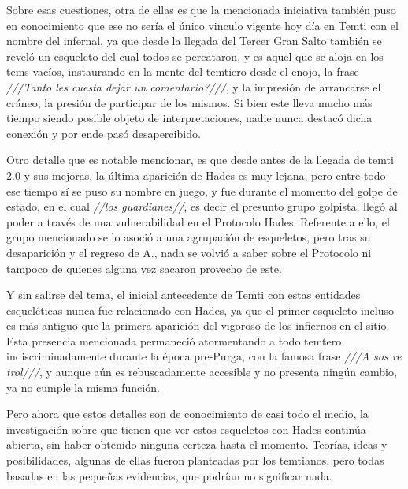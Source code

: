 \documentclass[
  spanish,
]{book}
\begin{document}
Sobre esas cuestiones, otra de ellas es que la mencionada iniciativa también puso en conocimiento que ese no sería el único vinculo vigente hoy día en Temti con el nombre del infernal, ya que desde la llegada del Tercer Gran Salto también se reveló un esqueleto del cual todos se percataron, y es aquel que se aloja en los tems vacíos, instaurando en la mente del temtiero desde el enojo, la frase \emph{///Tanto les cuesta dejar un comentario?///}, y la impresión de arrancarse el cráneo, la presión de participar de los mismos. Si bien este lleva mucho más tiempo siendo posible objeto de interpretaciones, nadie nunca destacó dicha conexión y por ende pasó desapercibido.

Otro detalle que es notable mencionar, es que desde antes de la llegada de temti 2.0 y sus mejoras, la última aparición de Hades es muy lejana, pero entre todo ese tiempo sí se puso su nombre en juego, y fue durante el momento del golpe de estado, en el cual \emph{//los guardianes//}, es decir el presunto grupo golpista, llegó al poder a través de una vulnerabilidad en el Protocolo Hades. Referente a ello, el grupo mencionado se lo asoció a una agrupación de esqueletos, pero tras su desaparición y el regreso de A., nada se volvió a saber sobre el Protocolo ni tampoco de quienes alguna vez sacaron provecho de este.

Y sin salirse del tema, el inicial antecedente de Temti con estas entidades esqueléticas nunca fue relacionado con Hades, ya que el primer esqueleto incluso es más antiguo que la primera aparición del vigoroso de los infiernos en el sitio. Esta presencia mencionada permaneció atormentando a todo temtero indiscriminadamente durante la época pre-Purga, con la famosa frase \emph{///A sos re trol///}, y aunque aún es rebuscadamente accesible y no presenta ningún cambio, ya no cumple la misma función.

Pero ahora que estos detalles son de conocimiento de casi todo el medio, la investigación sobre que tienen que ver estos esqueletos con Hades continúa abierta, sin haber obtenido ninguna certeza hasta el momento. Teorías, ideas y posibilidades, algunas de ellas fueron planteadas por los temtianos, pero todas basadas en las pequeñas evidencias, que podrían no significar nada.
\end{document}
